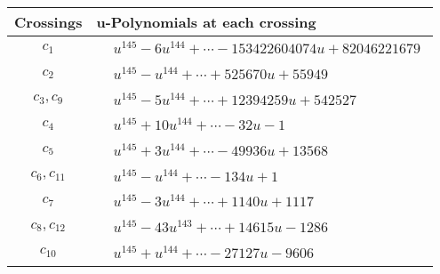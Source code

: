 \documentclass[1p]{elsarticle_modified}
\theoremstyle{definition}
\begin{document}
\begin{tabular}{m{50pt}|m{274pt}}
Crossings & \hspace{64pt}u-Polynomials at each crossing \\
\hline $$\begin{aligned}c_{1}\end{aligned}$$&$\begin{aligned}
&u^{145}-6 u^{144}+\cdots-153422604074 u+82046221679
\end{aligned}$\\
\hline $$\begin{aligned}c_{2}\end{aligned}$$&$\begin{aligned}
&u^{145}- u^{144}+\cdots+525670 u+55949
\end{aligned}$\\
\hline $$\begin{aligned}c_{3},c_{9}\end{aligned}$$&$\begin{aligned}
&u^{145}-5 u^{144}+\cdots+12394259 u+542527
\end{aligned}$\\
\hline $$\begin{aligned}c_{4}\end{aligned}$$&$\begin{aligned}
&u^{145}+10 u^{144}+\cdots-32 u-1
\end{aligned}$\\
\hline $$\begin{aligned}c_{5}\end{aligned}$$&$\begin{aligned}
&u^{145}+3 u^{144}+\cdots-49936 u+13568
\end{aligned}$\\
\hline $$\begin{aligned}c_{6},c_{11}\end{aligned}$$&$\begin{aligned}
&u^{145}- u^{144}+\cdots-134 u+1
\end{aligned}$\\
\hline $$\begin{aligned}c_{7}\end{aligned}$$&$\begin{aligned}
&u^{145}-3 u^{144}+\cdots+1140 u+1117
\end{aligned}$\\
\hline $$\begin{aligned}c_{8},c_{12}\end{aligned}$$&$\begin{aligned}
&u^{145}-43 u^{143}+\cdots+14615 u-1286
\end{aligned}$\\
\hline $$\begin{aligned}c_{10}\end{aligned}$$&$\begin{aligned}
&u^{145}+u^{144}+\cdots-27127 u-9606
\end{aligned}$\\
\hline
\end{tabular}\\~\\
\end{document}
